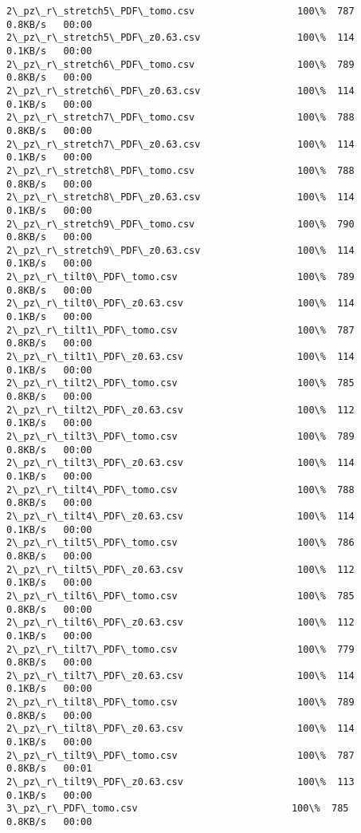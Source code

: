 \documentclass[11pt]{article}
\begin{document}
\begin{Verbatim}[commandchars=\\\{\}]
2\_pz\_r\_stretch5\_PDF\_tomo.csv                  100\%  787     0.8KB/s   00:00    
2\_pz\_r\_stretch5\_PDF\_z0.63.csv                 100\%  114     0.1KB/s   00:00    
2\_pz\_r\_stretch6\_PDF\_tomo.csv                  100\%  789     0.8KB/s   00:00    
2\_pz\_r\_stretch6\_PDF\_z0.63.csv                 100\%  114     0.1KB/s   00:00    
2\_pz\_r\_stretch7\_PDF\_tomo.csv                  100\%  788     0.8KB/s   00:00    
2\_pz\_r\_stretch7\_PDF\_z0.63.csv                 100\%  114     0.1KB/s   00:00    
2\_pz\_r\_stretch8\_PDF\_tomo.csv                  100\%  788     0.8KB/s   00:00    
2\_pz\_r\_stretch8\_PDF\_z0.63.csv                 100\%  114     0.1KB/s   00:00    
2\_pz\_r\_stretch9\_PDF\_tomo.csv                  100\%  790     0.8KB/s   00:00    
2\_pz\_r\_stretch9\_PDF\_z0.63.csv                 100\%  114     0.1KB/s   00:00    
2\_pz\_r\_tilt0\_PDF\_tomo.csv                     100\%  789     0.8KB/s   00:00    
2\_pz\_r\_tilt0\_PDF\_z0.63.csv                    100\%  114     0.1KB/s   00:00    
2\_pz\_r\_tilt1\_PDF\_tomo.csv                     100\%  787     0.8KB/s   00:00    
2\_pz\_r\_tilt1\_PDF\_z0.63.csv                    100\%  114     0.1KB/s   00:00    
2\_pz\_r\_tilt2\_PDF\_tomo.csv                     100\%  785     0.8KB/s   00:00    
2\_pz\_r\_tilt2\_PDF\_z0.63.csv                    100\%  112     0.1KB/s   00:00    
2\_pz\_r\_tilt3\_PDF\_tomo.csv                     100\%  789     0.8KB/s   00:00    
2\_pz\_r\_tilt3\_PDF\_z0.63.csv                    100\%  114     0.1KB/s   00:00    
2\_pz\_r\_tilt4\_PDF\_tomo.csv                     100\%  788     0.8KB/s   00:00    
2\_pz\_r\_tilt4\_PDF\_z0.63.csv                    100\%  114     0.1KB/s   00:00    
2\_pz\_r\_tilt5\_PDF\_tomo.csv                     100\%  786     0.8KB/s   00:00    
2\_pz\_r\_tilt5\_PDF\_z0.63.csv                    100\%  112     0.1KB/s   00:00    
2\_pz\_r\_tilt6\_PDF\_tomo.csv                     100\%  785     0.8KB/s   00:00    
2\_pz\_r\_tilt6\_PDF\_z0.63.csv                    100\%  112     0.1KB/s   00:00    
2\_pz\_r\_tilt7\_PDF\_tomo.csv                     100\%  779     0.8KB/s   00:00    
2\_pz\_r\_tilt7\_PDF\_z0.63.csv                    100\%  114     0.1KB/s   00:00    
2\_pz\_r\_tilt8\_PDF\_tomo.csv                     100\%  789     0.8KB/s   00:00    
2\_pz\_r\_tilt8\_PDF\_z0.63.csv                    100\%  114     0.1KB/s   00:00    
2\_pz\_r\_tilt9\_PDF\_tomo.csv                     100\%  787     0.8KB/s   00:01    
2\_pz\_r\_tilt9\_PDF\_z0.63.csv                    100\%  113     0.1KB/s   00:00    
3\_pz\_r\_PDF\_tomo.csv                           100\%  785     0.8KB/s   00:00    

\end{Verbatim}
\end{document}
